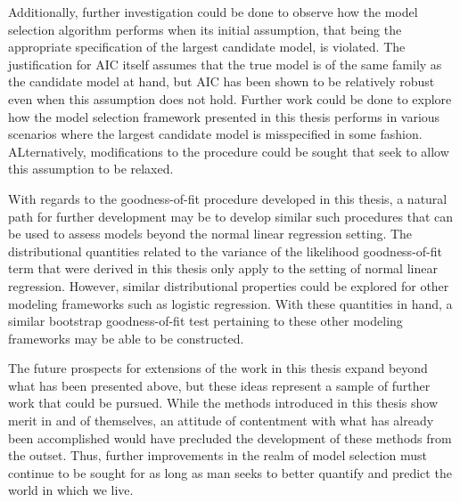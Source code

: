 		Additionally, further investigation could be done to observe how the model selection algorithm performs when its initial assumption, that being the appropriate
		specification of the largest candidate model, is violated. The justification for AIC itself assumes that the true model is of the same family as the candidate model
		at hand, but AIC has been shown to be relatively robust even when this assumption does not hold. Further work could be done to explore how the model selection
		framework presented in this thesis performs in various scenarios where the largest candidate model is misspecified in some fashion. ALternatively, modifications
		to the procedure could be sought that seek to allow this assumption to be relaxed.

		With regards to the goodness-of-fit procedure developed in this thesis, a natural path for further development may be to develop similar such procedures that can
		be used to assess models beyond the normal linear regression setting. The distributional quantities related to the variance of the likelihood goodness-of-fit term that were derived
		in this thesis only apply to the setting of normal linear regression. However, similar distributional properties could be explored for other modeling frameworks such
		as logistic regression. With these quantities in hand, a similar bootstrap goodness-of-fit test pertaining to these other modeling frameworks may be able to be constructed.
		
		The future prospects for extensions of the work in this thesis expand beyond what has been presented above, but these ideas represent a sample of further work that
		could be pursued. While the methods introduced in this thesis show merit in and of themselves, an attitude of contentment with what has already been accomplished
		would have precluded the development of these methods from the outset. Thus, further improvements in the realm of model selection must continue to be sought for as long as
		man seeks to better quantify and predict the world in which we live.
		
		
		